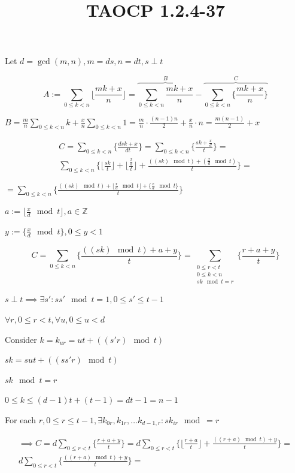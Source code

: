 \documentclass{article}
\title{TAOCP 1.2.4\mbox{-}37}
\begin{document}
\maketitle

Let \( d = \gcd(m,n), m = ds, n = dt, s \perp t \)

\[ A := \sum_{0 \leq k < n} \lfloor \frac{mk+x}{n} \rfloor = \overbrace{\sum_{0 \leq k < n} \frac{mk+x}{n}}^{B} - \overbrace{\sum_{0 \leq k < n} \{ \frac{mk+x}{n} \}}^{C} \]

\( B = \frac{m}{n} \sum_{0\leq k < n} k + \frac{x}{n} \sum_{0\leq k < n} 1 = \frac{m}{n}\cdot \frac{(n-1)n}{2} + \frac{x}{n}\cdot n = \frac{m(n-1)}{2} + x \)

\begin{multline*}
C = \sum_{0\leq k < n} \{ \frac{dsk+x}{dt} \} = \sum_{0\leq k < n} \{ \frac{sk+\frac{x}{d}}{t} \} = \\
\sum_{0\leq k < n} \{ \lfloor \frac{sk}{t} \rfloor + \lfloor \frac{\frac{x}{d}}{t} \rfloor + \frac{((sk) \mod t) + (\frac{x}{d} \mod t)}{t} \} =
\end{multline*}

\( = \sum_{0\leq k < n} \{ \frac{((sk) \mod t) + \lfloor \frac{x}{d} \mod t \rfloor + \{ \frac{x}{d} \mod t \} }{t} \} \)

\( a := \lfloor \frac{x}{d} \mod t \rfloor, a \in \mathbb{Z} \)

\( y := \{ \frac{x}{d} \mod t \}, 0 \leq y < 1 \)

\[ C = \sum_{0\leq k < n} \{ \frac{((sk) \mod t) + a + y }{t} \} = \sum_{\substack{0\leq r < t\\0 \leq k < n \\ sk \mod t = r}} \{ \frac{r + a + y }{t} \} \]

\( s \perp t \implies \exists s': ss' \mod t = 1, 0 \leq s' \leq t - 1 \)

\( \forall r, 0 \leq r < t, \forall u, 0 \leq u < d \)

Consider \( k = k_{ur} = ut + ((s'r) \mod t) \)

\( sk = sut + ((ss'r) \mod t) \)

\( sk \mod t = r \)

\( 0 \leq k \leq (d-1)t + (t-1) = dt - 1 = n - 1 \)

For each \( r, 0 \leq r \leq t - 1, \exists k_{0r}, k_{1r}, \ldots k_{d-1,r}: sk_{ir} \mod = r \)

\begin{multline*}
\implies C = d\sum_{0 \leq r < t} \{ \frac{r + a + y }{t} \} = d\sum_{0 \leq r < t} \{ \lfloor \frac{r+a}{t} \rfloor + \frac{((r + a) \mod t)  + y }{t} \} = \\
d\sum_{0 \leq r < t} \{ \frac{((r + a) \mod t)  + y }{t} \} =
\end{multline*}
\end{document}
